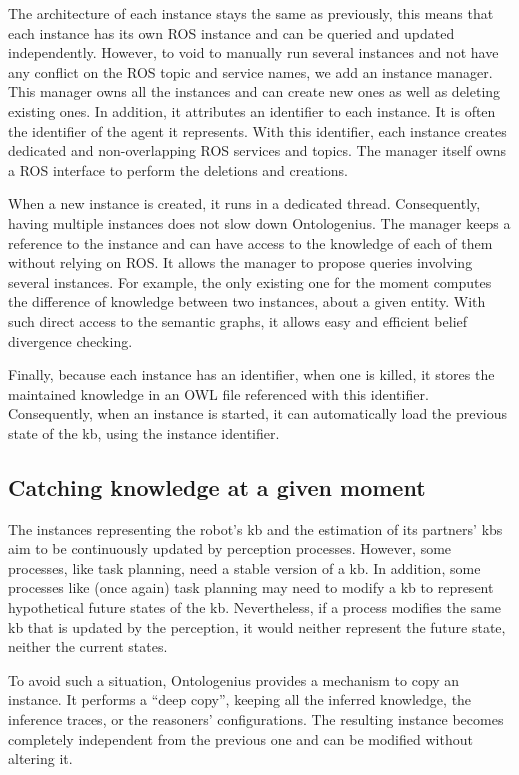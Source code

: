 The architecture of each instance stays the same as previously, this means that each instance has its own ROS instance and can be queried and updated independently. However, to void to manually run several instances and not have any conflict on the ROS topic and service names, we add an instance manager. This manager owns all the instances and can create new ones as well as deleting existing ones. In addition, it attributes an identifier to each instance. It is often the identifier of the agent it represents. With this identifier, each instance creates dedicated and non-overlapping ROS services and topics. The manager itself owns a ROS interface to perform the deletions and creations.

When a new instance is created, it runs in a dedicated thread. Consequently, having multiple instances does not slow down Ontologenius. The manager keeps a reference to the instance and can have access to the knowledge of each of them without relying on ROS. It allows the manager to propose queries involving several instances. For example, the only existing one for the moment computes the difference of knowledge between two instances, about a given entity. With such direct access to the semantic graphs, it allows easy and efficient belief divergence checking.

Finally, because each instance has an identifier, when one is killed, it stores the maintained knowledge in an OWL file referenced with this identifier. Consequently, when an instance is started, it can automatically load the previous state of the \acrshort{kb}, using the instance identifier.

\subsection{Catching knowledge at a given moment}

The instances representing the robot's \acrshort{kb} and the estimation of its partners' \acrshort{kb}s aim to be continuously updated by perception processes. However, some processes, like task planning, need a stable version of a \acrshort{kb}. In addition, some processes like (once again) task planning may need to modify a \acrshort{kb} to represent hypothetical future states of the \acrshort{kb}. Nevertheless, if a process modifies the same \acrshort{kb} that is updated by the perception, it would neither represent the future state, neither the current states.

To avoid such a situation, Ontologenius provides a mechanism to copy an instance. It performs a ``deep copy'', keeping all the inferred knowledge, the inference traces, or the reasoners' configurations. The resulting instance becomes completely independent from the previous one and can be modified without altering it.

